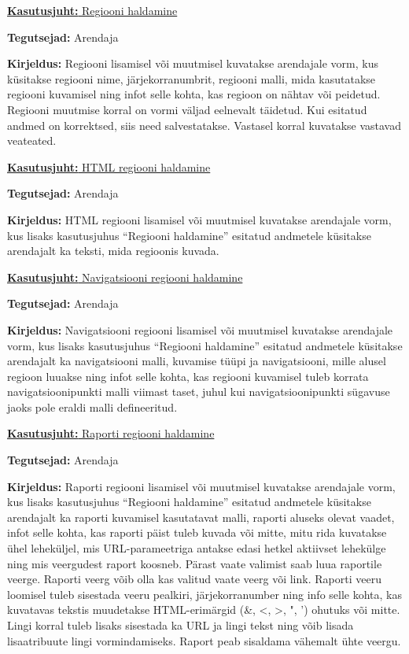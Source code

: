 \documentclass[a4paper,12pt]{article} %
\begin{document}
\underline{\textbf{Kasutusjuht:} Regiooni haldamine}
\par
\textbf{Tegutsejad:} Arendaja
\par
\textbf{Kirjeldus:} Regiooni lisamisel või muutmisel kuvatakse arendajale vorm, kus küsitakse regiooni nime, järjekorranumbrit, regiooni malli, mida kasutatakse regiooni kuvamisel ning infot selle kohta, kas regioon on nähtav või peidetud. Regiooni muutmise korral on vormi väljad eelnevalt täidetud. Kui esitatud andmed on korrektsed, siis need salvestatakse. Vastasel korral kuvatakse vastavad veateated.

\underline{\textbf{Kasutusjuht:} HTML regiooni haldamine}
\par
\textbf{Tegutsejad:} Arendaja
\par
\textbf{Kirjeldus:} HTML regiooni lisamisel või muutmisel kuvatakse arendajale vorm, kus lisaks kasutusjuhus ``Regiooni haldamine'' esitatud andmetele küsitakse arendajalt ka teksti, mida regioonis kuvada.

\underline{\textbf{Kasutusjuht:} Navigatsiooni regiooni haldamine}
\par
\textbf{Tegutsejad:} Arendaja
\par
\textbf{Kirjeldus:} Navigatsiooni regiooni lisamisel või muutmisel kuvatakse arendajale vorm, kus lisaks kasutusjuhus ``Regiooni haldamine'' esitatud andmetele küsitakse arendajalt ka navigatsiooni malli, kuvamise tüüpi ja navigatsiooni, mille alusel regioon luuakse ning infot selle kohta, kas regiooni kuvamisel tuleb korrata navigatsioonipunkti malli viimast taset, juhul kui navigatsioonipunkti sügavuse jaoks pole eraldi malli defineeritud.

\underline{\textbf{Kasutusjuht:} Raporti regiooni haldamine}
\par
\textbf{Tegutsejad:} Arendaja
\par
\textbf{Kirjeldus:} Raporti regiooni lisamisel või muutmisel kuvatakse arendajale vorm, kus lisaks kasutusjuhus ``Regiooni haldamine'' esitatud andmetele küsitakse arendajalt ka raporti kuvamisel kasutatavat malli, raporti aluseks olevat vaadet, infot selle kohta, kas raporti päist tuleb kuvada või mitte, mitu rida kuvatakse ühel leheküljel, mis URL-parameetriga antakse edasi hetkel aktiivset lehekülge ning mis veergudest raport koosneb. Pärast vaate valimist saab luua raportile veerge. Raporti veerg võib olla kas valitud vaate veerg või link. Raporti veeru loomisel tuleb sisestada veeru pealkiri, järjekorranumber ning info selle kohta, kas kuvatavas tekstis muudetakse HTML-erimärgid (\&, <, >, ", ') ohutuks või mitte. Lingi korral tuleb lisaks sisestada ka URL ja lingi tekst ning võib lisada lisaatribuute lingi vormindamiseks. Raport peab sisaldama vähemalt ühte veergu.
\end{document}
